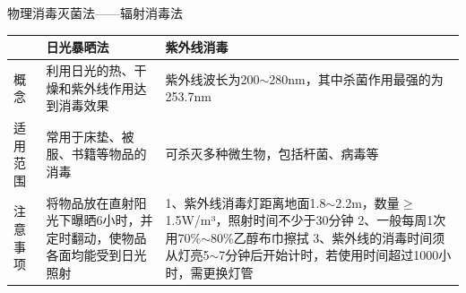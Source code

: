 \documentclass[11pt, a4paper]{ctexart}
\begin{document}
\begin{tipsbox}{物理消毒灭菌法——辐射消毒法}
	\begin{tabular}{|p{3cm}|p{5cm}|p{5cm}|}
		\hline
		     & \textbf{日光暴晒法}                      & \textbf{紫外线消毒}                                                                                                                        \\
		\hline
		概念   & 利用日光的热、干燥和紫外线作用达到消毒效果               & 紫外线波长为200$\sim$280nm，其中杀菌作用最强的为253.7nm                                                                                                \\
		\hline
		适用范围 & 常用于床垫、被服、书籍等物品的消毒                   & 可杀灭多种微生物，包括杆菌、病毒等                                                                                                                     \\
		\hline
		注意事项 & 将物品放在直射阳光下曝晒6小时，并定时翻动，使物品各面均能受到日光照射 & 1、紫外线消毒灯距离地面1.8$\sim$2.2m，数量$\geq$1.5W/m³，照射时间不少于30分钟 2、一般每周1次用70\%$\sim$80\%乙醇布巾擦拭 3、紫外线的消毒时间须从灯亮5$\sim$7分钟后开始计时，若使用时间超过1000小时，需更换灯管 \\
		\hline
	\end{tabular}
\end{tipsbox}
\end{document}

